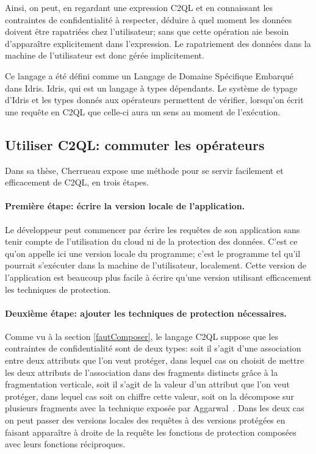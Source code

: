 Ainsi, on peut, en regardant une expression C2QL et en connaissant les
contraintes de confidentialité à respecter,
déduire à quel moment les données doivent être rapatriées chez l'utilisateur;
sans que cette opération aie besoin d'apparaître explicitement dans l'expression.
Le rapatriement des données dans la machine de l'utilisateur
est donc gérée implicitement.



Ce langage a été défini comme un Langage de Domaine Spécifique Embarqué dans
Idris. Idris, qui est un langage à types dépendants.
Le système de typage d'Idris et les types donnés aux opérateurs permettent
de vérifier, lorsqu'on écrit une requête en C2QL que celle-ci aura un sens
au moment de l'exécution.

\subsection{Utiliser C2QL: commuter les opérateurs}
\label{passage}
Dans sa thèse, Cherrueau expose une méthode pour se servir facilement
et efficacement de C2QL, en trois étapes.

\paragraph{Première étape: écrire la version locale de l'application.}
Le développeur peut commencer par écrire les requêtes de son application
sans tenir compte de l'utilisation du cloud ni de la protection
des données. C'est ce qu'on appelle ici une version \og locale \fg{}
du programme; c'est le programme tel qu'il pourrait s'exécuter dans la machine de l'utilisateur, localement.
Cette version de l'application est beaucoup plus facile à écrire 
qu'une version utilisant efficacement les techniques de protection.

\paragraph{Deuxième étape: ajouter les techniques de protection nécessaires.}
Comme vu à la section \ref{fautComposer}, le langage C2QL suppose que les contraintes de confidentialité sont de deux types:
soit il s'agit d'une association entre deux attributs que l'on veut 
protéger, dans lequel cas on choisit de mettre les deux attributs de l'association
dans des fragments distincts grâce à la fragmentation verticale, soit il s'agit de la
valeur d'un attribut que l'on veut protéger, dans lequel cas soit on chiffre cette valeur,
soit on la décompose sur plusieurs fragments avec la technique exposée par Aggarwal~\cite{aggar}. Dans les deux cas on peut passer des 
versions locales des requêtes à des versions protégées en faisant apparaître 
à droite de la requête les fonctions de protection composées avec leurs fonctions réciproques.

